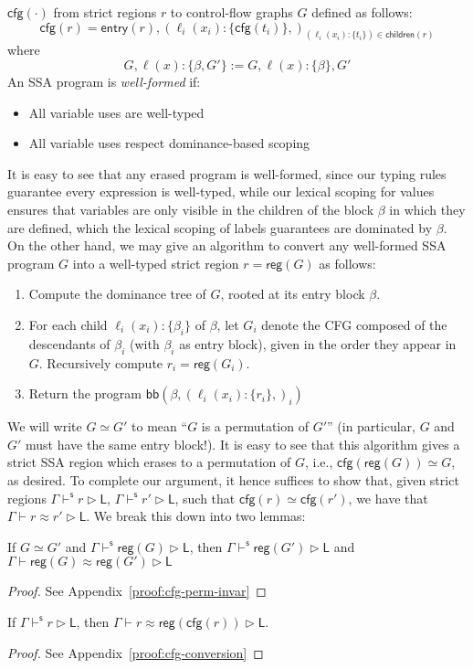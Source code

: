 \documentclass[acmsmall,screen,review]{acmart}
\newcommand{\ms}[1]{\ensuremath{\mathsf{#1}}}
\newcommand{\lto}{:}
\newcommand{\wbranch}[3]{#1(#2) \lto \{#3\}}
\newcommand{\shaslb}[3]{#1 \vdash^{\ms{s}} #2 \rhd #3}
\newcommand{\teqv}{\approx}
\newcommand{\lbeq}[4]{#1 \vdash #2 \teqv #3 \rhd {#4}}
\newcommand{\toentry}[1]{\ms{entry}(#1)}
\newcommand{\todom}[1]{\ms{children}(#1)}
\newcommand{\tocfg}[1]{\ms{cfg}(#1)}
\newcommand{\adddom}[2]{\ms{bb}(#1, #2)}
\newcommand{\toreg}[1]{\ms{reg}(#1)}
\begin{document}
$\tocfg{\cdot}$ from strict regions $r$ to control-flow graphs $G$ defined as follows:
\begin{equation}
    \tocfg{r} = \toentry{r}, (\wbranch{\ell_i}{x_i}{\tocfg{t_i}},)_{
      (\wbranch{\ell_i}{x_i}{t_i}) \in \todom{r}}
\end{equation}
where
\begin{equation}
  G, \wbranch{\ell}{x}{\beta, G'} := G, \wbranch{\ell}{x}{\beta}, G' 
\end{equation}
An SSA program is \emph{well-formed} if:
\begin{itemize}
  \item All variable uses are well-typed
  \item All variable uses respect dominance-based scoping
\end{itemize}
It is easy to see that any erased program is well-formed, since our typing rules guarantee every
expression is well-typed, while our lexical scoping for values ensures that variables are only
visible in the children of the block $\beta$ in which they are defined, which the lexical scoping of
labels guarantees are dominated by $\beta$. On the other hand, we may give an algorithm to convert
any well-formed SSA program $G$ into a well-typed strict region $r = \toreg{G}$ as follows:
\begin{enumerate}
  \item Compute the dominance tree of $G$, rooted at its entry block $\beta$.
  \item For each child $\wbranch{\ell_i}{x_i}{\beta_i}$ of $\beta$, let $G_i$ denote the CFG
  composed of the descendants of $\beta_i$ (with $\beta_i$ as entry block), given in the order they
  appear in $G$. Recursively compute $r_i = \toreg{G_i}$.
  \item Return the program $\adddom{\beta}{(\wbranch{\ell_i}{x_i}{r_i},)_i}$
\end{enumerate}
We will write $G \simeq G'$ to mean ``$G$ is a permutation of $G'$'' (in particular, $G$ and $G'$
must have the same entry block!). It is easy to see that this algorithm gives a strict SSA region
which erases to a permutation of $G$, i.e., $\tocfg{\toreg{G}} \simeq G$, as desired. To complete
our argument, it hence suffices to show that, given strict regions $\shaslb{\Gamma}{r}{\ms{L}}$,
$\shaslb{\Gamma}{r'}{\ms{L}}$, such that $\tocfg{r} \simeq \tocfg{r'}$, we have that
$\lbeq{\Gamma}{r}{r'}{\ms{L}}$. We break this down into two lemmas:
\begin{lemma}[name=Permutation Invariance, restate=cfgperminvar]
  If $G \simeq G'$ and $\shaslb{\Gamma}{\toreg{G}}{\ms{L}}$, then 
    $\shaslb{\Gamma}{\toreg{G'}}{\ms{L}}$ and $\lbeq{\Gamma}{\toreg{G}}{\toreg{G'}}{\ms{L}}$
\end{lemma}
\begin{proof}
  See Appendix~\ref{proof:cfg-perm-invar}
\end{proof}
\begin{lemma}[name=CFG Conversion, restate=cfgconversion]
  If $\shaslb{\Gamma}{r}{\ms{L}}$, then $\lbeq{\Gamma}{r}{\toreg{\tocfg{r}}}{\ms{L}}$.
\end{lemma}
\begin{proof}
  See Appendix~\ref{proof:cfg-conversion}
\end{proof}
\end{document}

